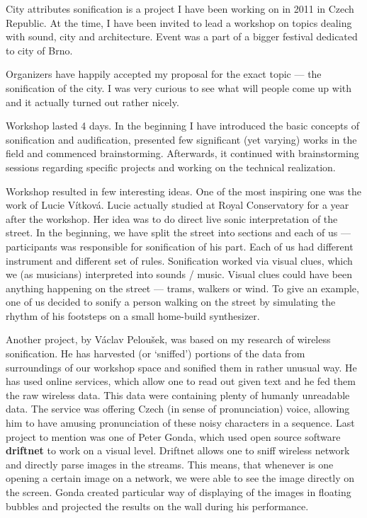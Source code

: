 \documentclass[12pt,a4paper,oneside]{report}
\begin{document}
City attributes sonification is a project I have been working on in 2011 in Czech Republic. At the time, I have been invited to lead a workshop on topics dealing with sound, city and architecture. Event was a part of a bigger festival dedicated to city of Brno.

Organizers have happily accepted my proposal for the exact topic --- the sonification of the city. I was very curious to see what will people come up with and it actually turned out rather nicely. 

Workshop lasted 4 days. In the beginning I have introduced the basic concepts of sonification and audification, presented few significant (yet varying) works in the field and commenced brainstorming. Afterwards, it continued with brainstorming sessions regarding specific projects and working on the technical realization.

Workshop resulted in few interesting ideas. One of the most inspiring one was the work of Lucie Vítková. Lucie actually studied at Royal Conservatory for a year after the workshop. Her idea was to do direct live sonic interpretation of the street. In the beginning, we have split the street into sections and each of us --- participants was responsible for sonification of his part. Each of us had different instrument and different set of rules. Sonification worked via visual clues, which we (as musicians) interpreted into sounds / music. Visual clues could have been anything happening on the street --- trams, walkers or wind. To give an example, one of us decided to sonify a person walking on the street by simulating the rhythm of his footsteps on a small home-build synthesizer.

Another project, by Václav Peloušek, was based on my research of wireless sonification. He has harvested (or `sniffed') portions of the data from surroundings of our workshop space and sonified them in rather unusual way. He has used online services, which allow one to read out given text and he fed them the raw wireless data. This data were containing plenty of humanly unreadable data. The service was offering Czech (in sense of pronunciation) voice, allowing him to have amusing pronunciation of these noisy characters in a sequence. Last project to mention was one of Peter Gonda, which used open source software \textbf{driftnet} to work on a visual level. Driftnet allows one to sniff wireless network and directly parse images in the streams. This means, that whenever is one opening a certain image on a network, we were able to see the image directly on the screen. Gonda created particular way of displaying of the images in floating bubbles and projected the results on the wall during his performance.
\end{document}
